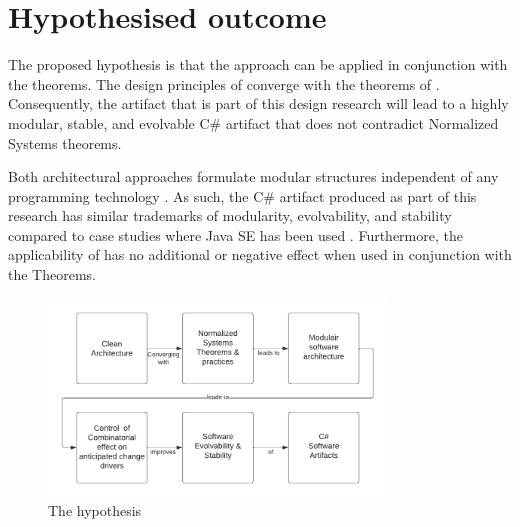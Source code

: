 \section{Hypothesised outcome} \label{hypothesis} 

The proposed hypothesis is that the \ca approach can be applied in conjunction with
the \ns theorems. The design principles of \ca converge with the theorems of
\ns. Consequently, the artifact that is part of this design research will lead to a
highly modular, stable, and evolvable C\# artifact that does not contradict Normalized
Systems theorems.

Both architectural approaches formulate modular structures independent of any programming
technology \parencite{mannaert_normalized_2009,robert_c_martin_clean_2018}. As such, the
C\# artifact produced as part of this research has similar trademarks of modularity,
evolvability, and stability compared to case studies where Java SE has been used
\parencite{oorts_building_2014, de_bruyn_enabling_2018}. Furthermore, the applicability of
\ca has no additional or negative effect when used in conjunction with the
\ns Theorems.

\begin{figure}[H]
    \centering
    \includegraphics[width=0.8\textwidth]{Figures/hypothesis.pdf}
    \caption[The hypothesis]{The hypothesis}
    \label{fig_hypothesis}
\end{figure}